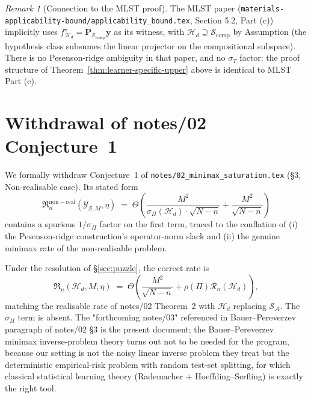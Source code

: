 \documentclass[11pt,a4paper]{article}
\theoremstyle{plain}
\theoremstyle{definition}
\theoremstyle{remark}
\newtheorem{remark}[theorem]{Remark}
\newcommand{\by}{\mathbf{y}}
\newcommand{\bP}{\mathbf{P}}
\newcommand{\Scal}{\mathcal{S}}
\newcommand{\Acal}{\mathcal{A}}
\newcommand{\Hcal}{\mathcal{H}}
\newcommand{\Ycal}{\mathcal{Y}}
\begin{document}
\begin{remark}[Connection to the MLST proof]
\label{rem:mlst-proof}
The MLST paper (\texttt{materials-applicability-bound/applicability\_bound.tex},
Section 5.2, Part (c)) implicitly uses
$f^\star_{\Hcal_d} = \bP_{\Scal_{\mathrm{comp}}}\by$ as its witness, with
$\Hcal_d \supseteq \Scal_{\mathrm{comp}}$ by Assumption (the hypothesis
class subsumes the linear projector on the compositional subspace).
There is no Pesenson-ridge ambiguity in that paper, and no $\sigma_T$
factor: the proof structure of Theorem~\ref{thm:learner-specific-upper}
above is identical to MLST Part (c).
\end{remark}

\section{Withdrawal of notes/02 Conjecture~1}
\label{sec:withdrawal}

We formally withdraw Conjecture~1 of \texttt{notes/02\_minimax\_saturation.tex}
(\S 3, Non-realisable case).  Its stated form
\begin{equation*}
    \mathfrak{R}_n^{\mathrm{non-real}}(\Ycal_{\Scal,M}, \eta)
    \;=\; \Theta\!\left(\frac{M^2}{\sigma_\Pi(\Hcal_d) \cdot \sqrt{N-n}}
        + \frac{M^2}{\sqrt{N-n}}\right)
\end{equation*}
contains a spurious $1/\sigma_\Pi$ factor on the first term, traced to
the conflation of (i) the Pesenson-ridge construction's
operator-norm slack and (ii) the genuine minimax rate of the
non-realisable problem.

Under the resolution of §\ref{sec:puzzle}, the correct rate is
\begin{equation}
    \mathfrak{R}_n(\Hcal_d, M, \eta)
    \;=\; \Theta\!\left(\frac{M^2}{\sqrt{N-n}} + \rho(\Pi) \mathcal{R}_n(\Hcal_d)\right),
    \label{eq:correct-rate-hd}
\end{equation}
matching the realisable rate of notes/02 Theorem~2 with $\Hcal_d$
replacing $\Scal_\Acal$.  The $\sigma_\Pi$ term is absent.  The
"forthcoming notes/03" referenced in Bauer--Pereverzev paragraph of
notes/02 §3 is the present document; the Bauer--Pereverzev minimax
inverse-problem theory turns out not to be needed for the program,
because our setting is not the noisy linear inverse problem they treat
but the deterministic empirical-risk problem with random
test-set splitting, for which classical statistical learning theory
(Rademacher + Hoeffding--Serfling) is exactly the right tool.
\end{document}
